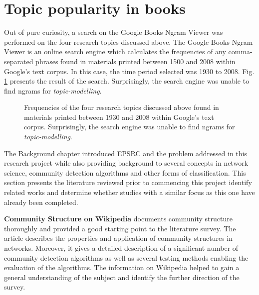 \section{Topic popularity in books}

Out of pure curiosity, a search on the Google Books Ngram Viewer \cite{google_ngram_viewer} was performed on the four research topics discussed above. The Google Books Ngram Viewer is an online search engine which calculates the frequencies of any comma-separated phrases found in materials printed between 1500 and 2008 within Google's text corpus. In this case, the time period selected was 1930 to 2008. Fig. \ref{figure:ngram_viewer} presents the result of the search. Surprisingly, the search engine was unable to find ngrams for \textit{topic-modelling}.

\begin{figure}[!htbp]
    \centering
    \caption[Frequencies of the four research topics discussed found in materials printed between 1930 and 2008 within Google's text corpus.]{Frequencies of the four research topics discussed above found in materials printed between 1930 and 2008 within Google's text corpus. Surprisingly, the search engine was unable to find ngrams for \textit{topic-modelling}.}
    \label{figure:ngram_viewer}
\end{figure}

\iffalse
The Background chapter introduced EPSRC and the problem addressed in this research project while also providing background to several concepts in network science, community detection algorithms and other forms of classification. This section presents the literature reviewed prior to commencing this project identify related works and determine whether studies with a similar focus as this one have already been completed.

\vspace*{1em}

\textbf{Community Structure on Wikipedia} \cite{wikipedia_community_structure} documents community structure thoroughly and provided a good starting point to the literature survey. The article describes the properties and application of community structures in networks. Moreover, it gives a detailed description of a significant number of community detection algorithms as well as several testing methods enabling the evaluation of the algorithms. The information on Wikipedia helped to gain a general understanding of the subject and identify the further direction of the survey.

